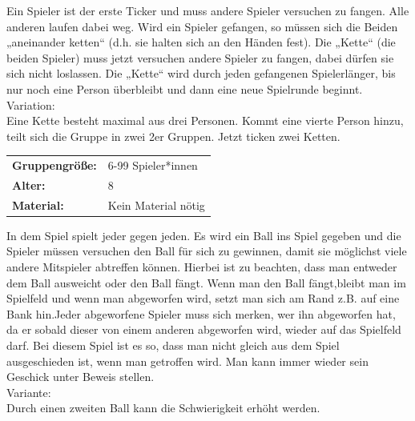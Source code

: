 Ein Spieler ist der erste Ticker und muss andere Spieler versuchen zu fangen.  Alle anderen laufen dabei weg. Wird ein Spieler gefangen, so müssen sich die Beiden „aneinander ketten“ (d.h. sie halten sich an den Händen fest). Die „Kette“ (die beiden Spieler) muss jetzt versuchen andere Spieler zu fangen, dabei dürfen sie sich nicht loslassen. Die „Kette“ wird durch jeden gefangenen Spielerlänger, bis nur noch eine Person überbleibt und dann eine neue Spielrunde beginnt.  \\ \newline
    Variation: \\ Eine Kette besteht maximal aus drei Personen. Kommt eine vierte Person hinzu, teilt sich die Gruppe in zwei 2er Gruppen. Jetzt ticken zwei Ketten.\\




\begin{table}[H]
\begin{tabular}{>{\bfseries}lp{8cm}}
   Gruppengröße:   & 6-99 Spieler*innen\\
    Alter: & 8 \\
    Material: & Kein Material nötig \\ 
\end{tabular}
\end{table} 
 In dem Spiel spielt jeder gegen jeden. Es wird ein Ball ins Spiel gegeben und die Spieler müssen versuchen den Ball für sich zu gewinnen, damit sie möglichst viele andere Mitspieler abtreffen können. Hierbei ist zu beachten, dass man entweder dem Ball ausweicht oder den Ball fängt. Wenn man den Ball fängt,bleibt man im Spielfeld und wenn man abgeworfen wird, setzt man sich am Rand z.B. auf eine Bank hin.Jeder abgeworfene Spieler muss sich merken, wer ihn abgeworfen hat, da er sobald dieser von einem anderen abgeworfen wird, wieder auf das Spielfeld darf. Bei diesem Spiel ist es so, dass man nicht gleich aus dem Spiel ausgeschieden ist, wenn man getroffen wird. Man kann immer wieder sein Geschick unter Beweis stellen. \\ \newline
    Variante: \\ Durch einen zweiten Ball kann die Schwierigkeit erhöht werden.\\


